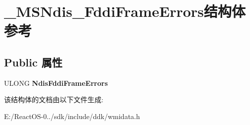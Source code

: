 \hypertarget{struct___m_s_ndis___fddi_frame_errors}{}\section{\+\_\+\+M\+S\+Ndis\+\_\+\+Fddi\+Frame\+Errors结构体 参考}
\label{struct___m_s_ndis___fddi_frame_errors}
\subsection*{Public 属性}
\begin{DoxyCompactItemize}
\item 
\mbox{\label{struct___m_s_ndis___fddi_frame_errors_acddbb7b8286087bc27f9a65b16471e9c}} 
U\+L\+O\+NG {\bfseries Ndis\+Fddi\+Frame\+Errors}
\end{DoxyCompactItemize}


该结构体的文档由以下文件生成\+:\begin{DoxyCompactItemize}
\item 
E\+:/\+React\+O\+S-\/0../sdk/include/ddk/wmidata.\+h\end{DoxyCompactItemize}
